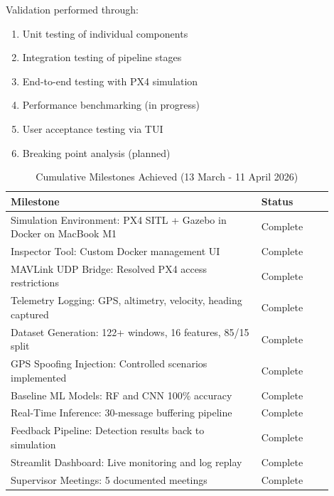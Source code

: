Validation performed through:

\begin{enumerate}
    \item Unit testing of individual components
    \item Integration testing of pipeline stages
    \item End-to-end testing with PX4 simulation
    \item Performance benchmarking (in progress)
    \item User acceptance testing via TUI
    \item Breaking point analysis (planned)
\end{enumerate}

\begin{table}[htbp]
    \centering
    \caption{Cumulative Milestones Achieved (13 March - 11 April 2026)}
    \label{tab:milestones}
    \begin{tabular}{|p{0.7\linewidth}|p{0.2\linewidth}|}
        \hline
        \textbf{Milestone} & \textbf{Status} \\
        \hline
        Simulation Environment: PX4 SITL + Gazebo in Docker on MacBook M1 & Complete \\
        \hline
        Inspector Tool: Custom Docker management UI & Complete \\
        \hline
        MAVLink UDP Bridge: Resolved PX4 access restrictions & Complete \\
        \hline
        Telemetry Logging: GPS, altimetry, velocity, heading captured & Complete \\
        \hline
        Dataset Generation: 122+ windows, 16 features, 85/15 split & Complete \\
        \hline
        GPS Spoofing Injection: Controlled scenarios implemented & Complete \\
        \hline
        Baseline ML Models: RF and CNN 100\% accuracy & Complete \\
        \hline
        Real-Time Inference: 30-message buffering pipeline & Complete \\
        \hline
        Feedback Pipeline: Detection results back to simulation & Complete \\
        \hline
        Streamlit Dashboard: Live monitoring and log replay & Complete \\
        \hline
        Supervisor Meetings: 5 documented meetings & Complete \\
        \hline
    \end{tabular}
\end{table}